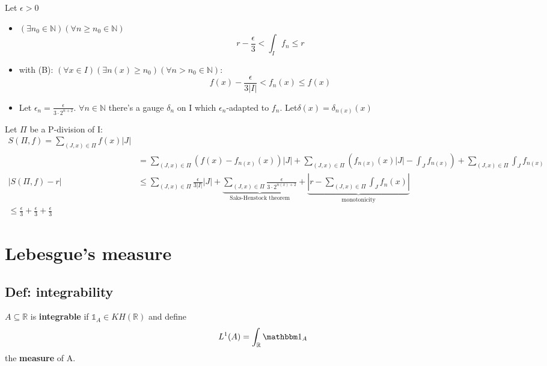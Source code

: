 \documentclass{book}
\newcommand{\abs}[1]{\left\lvert #1 \right\rvert}
\begin{document}
Let $\epsilon>0$
\begin{itemize}
    \item $(\exists n_0\in \mathbb N)(\forall n\geq n_0\in \mathbb N)$$$r-\frac{\epsilon}3<\int_If_n\leq r$$
    \item with (B): $(\forall x\in I)(\exists n(x)\geq n_0)(\forall n>n_0\in \mathbb N)$:$$f(x)-\frac{\epsilon}{3\abs I}<f_n(x)\leq f(x)$$
    \item Let $\epsilon_n=\frac{\epsilon}{3\cdot 2^{n+2}}$. $\forall n\in \mathbb N$ there's a gauge $\delta_n$ on I which $\epsilon_n$-adapted to $f_n$. Let$\delta(x)=\delta_{n(x)}(x)$
\end{itemize}
Let $\Pi$ be a P-division of I:
$$\begin{aligned}
    S(\Pi,f)=\sum\limits_{(J,x)\in \Pi}f(x)\abs J\\
    &=\sum\limits_{(J,x)\in \Pi}\left(f(x)-f_{n(x)}(x)\right)\abs J+\sum\limits_{(J,x)\in \Pi}\left(f_{n(x)}(x)\abs J-\int_Jf_{n(x)}\right)+\sum\limits_{(J,x)\in \Pi}\int_Jf_{n(x)}\\
    \abs{S(\Pi,f)-r}&\leq\sum\limits_{(J,x)\in \Pi}\frac{\epsilon}{3\abs I}\abs J+\underbrace{\sum\limits_{(J,x)\in \Pi}\frac{\epsilon}{3\cdot 2^{n(x)+2}}}\limits_{\text{Saks-Henstock theorem}}+\underbrace{\abs{r-\sum\limits_{(J,x)\in \Pi}\int_Jf_n(x)}}\limits_{\text{monotonicity}}\\
    \leq \frac{\epsilon}3+\frac{\epsilon}3+\frac{\epsilon}3
\end{aligned}$$
\chapter{Lebesgue's measure}
\section{Def: integrability}
$A\subseteq \mathbb R$ is \textbf{integrable} if $\mathbb 1_A\in KH(\mathbb R)$ and define$$L^1(A)=\int_{\mathbb R}\mathbbm 1_A$$ the \textbf{measure} of A.
\end{document}

